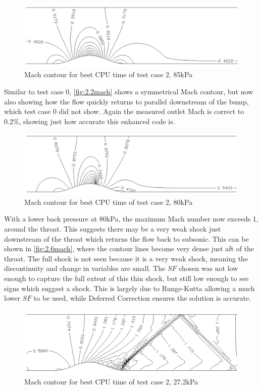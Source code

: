 \documentclass[12pt, a4paper]{article}
\begin{document}
\begin{figure}[H]
	\centering
	\includegraphics[width=\textwidth]{plots/2.2 mach}
	\caption{Mach contour for best CPU time of test case 2, 85kPa}
	\label{fig:2.2mach}
\end{figure}
Similar to test case 0, \autoref{fig:2.2mach} shows a symmetrical Mach contour, but now also showing how the flow quickly returns to parallel downstream of the bump, which test case 0 did not show. Again the measured outlet Mach is correct to 0.2\%, showing just how accurate this enhanced code is.
\begin{figure}[H]
	\centering
	\includegraphics[width=\textwidth]{plots/2.6 mach}
	\caption{Mach contour for best CPU time of test case 2, 80kPa}
	\label{fig:2.6mach}
\end{figure}
With a lower back pressure at 80kPa, the maximum Mach number now exceeds 1, around the throat. This suggests there may be a very weak shock just downstream of the throat which returns the flow back to subsonic. This can be shown in \autoref{fig:2.6mach}, where the contour lines become very dense just aft of the throat. The full shock is not seen because it is a very weak shock, meaning the discontinuity and change in variables are small. The $SF$ chosen was not low enough to capture the full extent of this thin shock, but still low enough to see signs which suggest a shock. This is largely due to Runge-Kutta allowing a much lower $SF$ to be used, while Deferred Correction ensures the solution is accurate.
\begin{figure}[H]
	\centering
	\includegraphics[width=\textwidth]{plots/2.7 mach}
	\caption{Mach contour for best CPU time of test case 2, 27.2kPa}
	\label{fig:2.7mach}
\end{figure}
\end{document}
